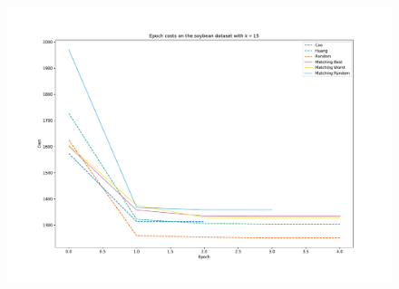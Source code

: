 \begin{figure}[h!]
    \centering
    \begin{minipage}{.495\textwidth}
        \includegraphics[width=\linewidth]{./img/epoch_plot_soybean.pdf}
    \end{minipage}
\end{figure}
